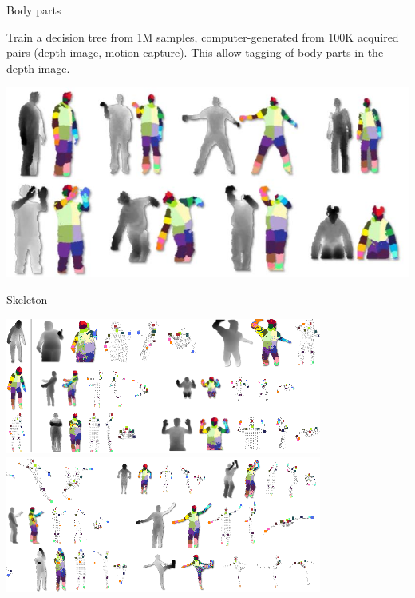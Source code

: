 \documentclass[compress]{beamer}
\begin{document}
{

\begin{frame}{Body parts}

    {\Medium Train a decision tree} from \approx 1M samples, computer-generated from
    \approx 100K acquired pairs (depth image, motion capture). This allow
    {\Medium tagging} of body parts in the depth image.

    \begin{center}
        \includegraphics[width=0.8\linewidth]{skeleton/training}
    \end{center}
\end{frame}
}

\begin{frame}{Skeleton}
    \begin{center}
        \includegraphics[width=0.8\linewidth]{skeleton/skel4}\\
        \includegraphics[width=0.8\linewidth]{skeleton/skel5}
    \end{center}
\end{frame}
\end{document}
